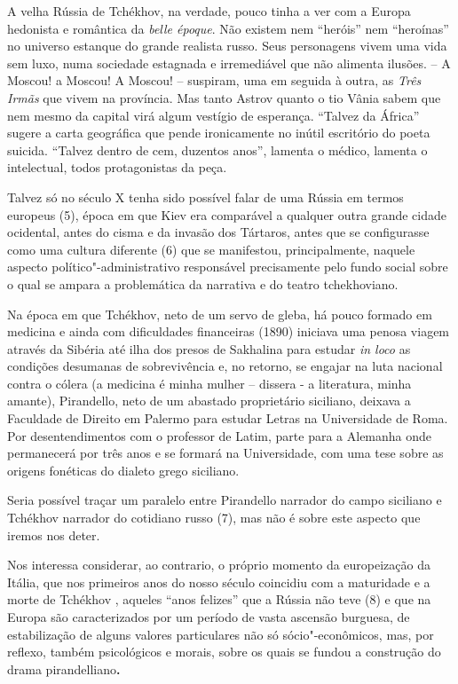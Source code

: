 A velha Rússia de Tchékhov, na verdade, pouco tinha a ver com a Europa
hedonista e romântica da \emph{belle époque}. Não existem nem ``heróis''
nem ``heroínas'' no universo estanque do grande realista russo. Seus
personagens vivem uma vida sem luxo, numa sociedade estagnada e
irremediável que não alimenta ilusões. -- A Moscou! a Moscou! A Moscou!
-- suspiram, uma em seguida à outra, as \emph{Três Irmãs} que vivem na
província. Mas tanto Astrov quanto o tio Vânia sabem que nem mesmo da
capital virá algum vestígio de esperança. ``Talvez da África'' sugere a
carta geográfica que pende ironicamente no inútil escritório do poeta
suicida. ``Talvez dentro de cem, duzentos anos'', lamenta o médico,
lamenta o intelectual, todos protagonistas da peça.

Talvez só no século X tenha sido possível falar de uma Rússia em termos
europeus (5), época em que Kiev era comparável a qualquer outra grande
cidade ocidental, antes do cisma e da invasão dos Tártaros, antes que se
configurasse como uma cultura diferente (6) que se manifestou,
principalmente, naquele aspecto político"-administrativo responsável
precisamente pelo fundo social sobre o qual se ampara a problemática da
narrativa e do teatro tchekhoviano.

Na época em que Tchékhov, neto de um servo de gleba, há pouco formado em
medicina e ainda com dificuldades financeiras (1890) iniciava uma penosa
viagem através da Sibéria até ilha dos presos de Sakhalina para estudar
\emph{in loco} as condições desumanas de sobrevivência e, no retorno, se
engajar na luta nacional contra o cólera (a medicina é minha mulher --
dissera - a literatura, minha amante), Pirandello, neto de um abastado
proprietário siciliano, deixava a Faculdade de Direito em Palermo para
estudar Letras na Universidade de Roma. Por desentendimentos com o
professor de Latim, parte para a Alemanha onde permanecerá por três anos
e se formará na Universidade, com uma tese sobre as origens fonéticas do
dialeto grego siciliano.

Seria possível traçar um paralelo entre Pirandello narrador do campo
siciliano e Tchékhov narrador do cotidiano russo (7), mas não é sobre
este aspecto que iremos nos deter.

Nos interessa considerar, ao contrario, o próprio momento da
europeização da Itália, que nos primeiros anos do nosso século coincidiu
com a maturidade e a morte de Tchékhov , aqueles ``anos felizes'' que a
Rússia não teve (8) e que na Europa são caracterizados por um período de
vasta ascensão burguesa, de estabilização de alguns valores particulares
não só sócio"-econômicos, mas, por reflexo, também psicológicos e morais,
sobre os quais se fundou a construção do drama pirandelliano\textbf{. }

